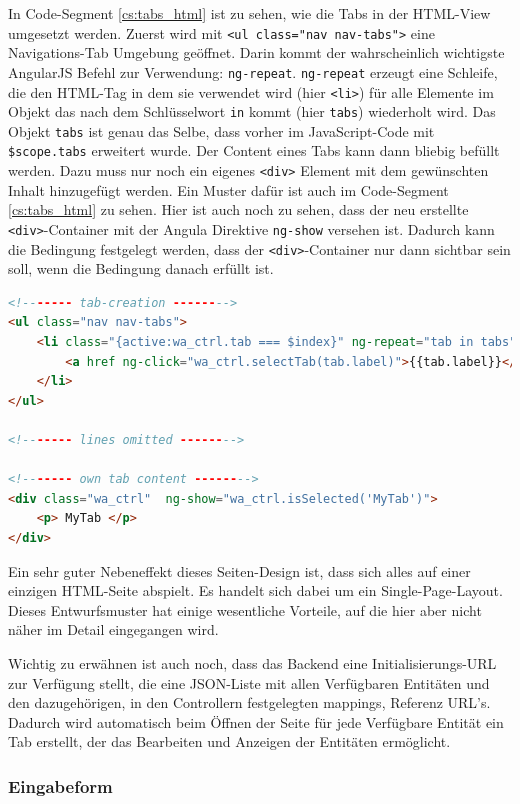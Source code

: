 In Code-Segment \ref{cs:tabs_html} ist zu sehen, wie die Tabs in der HTML-View umgesetzt werden. Zuerst wird mit \verb|<ul class="nav nav-tabs">| eine Navigations-Tab Umgebung geöffnet. Darin kommt der wahrscheinlich wichtigste AngularJS Befehl zur Verwendung: \verb|ng-repeat|. \verb|ng-repeat| erzeugt eine Schleife, die den HTML-Tag in dem sie verwendet wird (hier \verb|<li>|) für alle Elemente im Objekt das nach dem Schlüsselwort \verb|in| kommt (hier \verb|tabs|) wiederholt wird. Das Objekt \verb|tabs| ist genau das Selbe, dass vorher im JavaScript-Code mit \verb|$scope.tabs| erweitert wurde. Der Content eines Tabs kann dann bliebig befüllt werden. Dazu muss nur noch ein eigenes \verb|<div>| Element mit dem gewünschten Inhalt hinzugefügt werden. Ein Muster dafür ist auch im Code-Segment \ref{cs:tabs_html} zu sehen. Hier ist auch noch zu sehen, dass der neu erstellte \verb|<div>|-Container mit der Angula Direktive \verb|ng-show| versehen ist. Dadurch kann die Bedingung festgelegt werden, dass der \verb|<div>|-Container nur dann sichtbar sein soll, wenn die Bedingung danach erfüllt ist.

\scriptsize
\begin{lstlisting}[caption=index.html, label=cs:tabs_html, language=HTML]
<!------- tab-creation -------->
<ul class="nav nav-tabs">
	<li class="{active:wa_ctrl.tab === $index}" ng-repeat="tab in tabs">
		<a href ng-click="wa_ctrl.selectTab(tab.label)">{{tab.label}}</a></li>
	</li>
</ul>

<!------- lines omitted -------->

<!------- own tab content -------->
<div class="wa_ctrl"  ng-show="wa_ctrl.isSelected('MyTab')">
	<p> MyTab </p>
</div>
\end{lstlisting}
\normalsize

Ein sehr guter Nebeneffekt dieses Seiten-Design ist, dass sich alles auf einer einzigen HTML-Seite abspielt. Es handelt sich dabei um ein Single-Page-Layout. Dieses Entwurfsmuster hat einige wesentliche Vorteile, auf die hier aber nicht näher im Detail eingegangen wird. 

Wichtig zu erwähnen ist auch noch, dass das Backend eine Initialisierungs-URL zur Verfügung stellt, die eine JSON-Liste mit allen Verfügbaren Entitäten und den dazugehörigen, in den Controllern festgelegten mappings, Referenz URL's. Dadurch wird automatisch beim Öffnen der Seite für jede Verfügbare Entität ein Tab erstellt, der das Bearbeiten und Anzeigen der Entitäten ermöglicht.

\subsubsection{Eingabeform}

